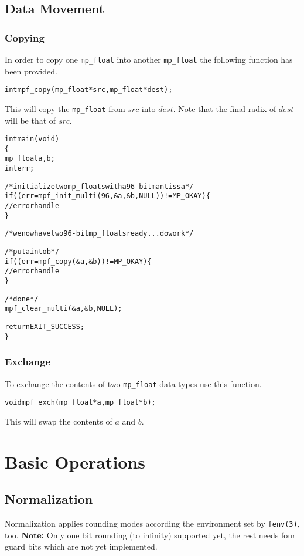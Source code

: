 \documentclass[a4paper]{book}
\theoremstyle{definition}
\theoremstyle{remark}
\begin{document}
\section{Data Movement}
\subsection{Copying}
In order to copy one {\texttt{mp\_float}} into another {\texttt{mp\_float}} the following function has been provided.

\begin{alltt}
int  mpf_copy(mp_float *src, mp_float *dest);
\end{alltt}
This will copy the {\texttt{mp\_float}} from $src$ into $dest$.  Note that the final radix of $dest$ will be that of $src$.

\begin{alltt}
int main(void)
\{
   mp_float a, b;
   int err;

   /* initialize two mp_floats with a 96-bit mantissa */
   if ((err = mpf_init_multi(96, &a, &b, NULL)) != MP_OKAY) \{
      // error handle
   \}

   /* we now have two 96-bit mp_floats ready ... do work */

   /* put a into b */
   if ((err = mpf_copy(&a, &b)) != MP_OKAY) \{
      // error handle
   \}
   
   /* done */
   mpf_clear_multi(&a, &b, NULL);

   return EXIT_SUCCESS;
\}
\end{alltt}

\subsection{Exchange}

To exchange the contents of two {\texttt{mp\_float}} data types use this function.

\begin{alltt}
void mpf_exch(mp_float *a, mp_float *b);
\end{alltt}

This will swap the contents of $a$ and $b$.  

\chapter{Basic Operations}
\section{Normalization}
Normalization applies rounding modes according the environment set by {\texttt{fenv(3)}}, too.
{\textbf{Note:}} Only one bit rounding (to infinity) supported yet, the rest needs four guard bits which are not yet implemented.
\end{document}
